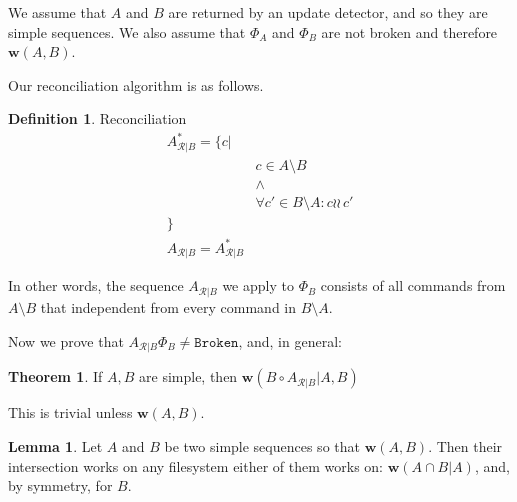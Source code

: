 \documentclass[12pt]{article}
\newcommand{\fsbroken}{\mathtt{Broken}} %
\newcommand{\FS}{\Phi} %
\newcommand{\cc}{\circ}
\newcommand{\indep}{\wr\!\!\wr\,} %
\newcommand{\works}[1]{{\mathbf{w}}({#1})}
\newcommand{\worksc}[2]{{\mathbf{w}}({#1}|{#2})}
\newcommand{\ordered}[1]{#1}
\newcommand{\recchar}[3]{{#1}^{#3}_{\mathcal{R}|{#2}}}
\newcommand{\reca}{\recchar{A}{B}{}} %
\newcommand{\recaset}{\recchar{A}{B}{*}}
\theoremstyle{definition}
\newtheorem{mydef}{Definition}
\newtheorem{mylem}{Lemma}
\newtheorem{myth}{Theorem}
\begin{document}
We assume that $A$ and $B$ are returned by an update detector,
and so they are simple sequences.
We also assume that $\FS_A$ and $\FS_B$ are not broken and therefore $\works{A,B}$.

Our reconciliation algorithm is as follows.

\begin{mydef}{Reconciliation}\label{def:reconciliation}
\begin{align*}
\recaset = \{c| & \\
& c\in A\setminus B \\
& \wedge \\
& \forall c'\in B\setminus A: c\indep c'\\
\} & \\
\reca = \ordered{\recaset}&
\end{align*}

In other words, the sequence $\reca$ we apply to $\FS_B$ consists of all commands from $A\setminus B$
that independent from every command in $B\setminus A$.
\end{mydef}

Now we prove that $\reca\FS_B\neq\fsbroken$, and, in general:

\begin{myth}
If $A, B$ are simple, then $\worksc{B\cc \reca}{A,B}$
\end{myth}

This is trivial unless $\works{A,B}$.

\begin{mylem}
Let $A$ and $B$ be two simple sequences so that $\works{A, B}$.
Then their intersection works on any filesystem
either of them works on:
$\worksc{\ordered{A\cap B}}{A}$, and, by symmetry, for $B$.
\end{mylem}
\end{document}
